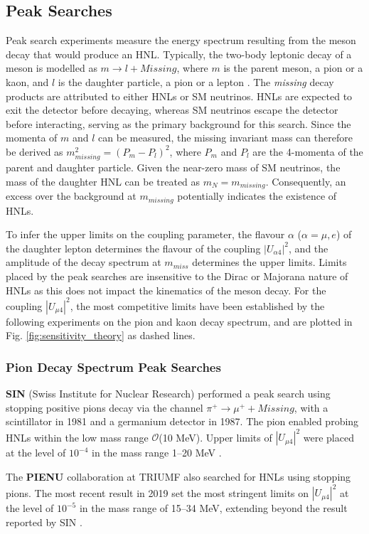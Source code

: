 \subsection{Peak Searches}
\label{sec:peaksearch}

Peak search experiments measure the energy spectrum resulting from the meson decay that would produce an HNL. 
Typically, the two-body leptonic decay of a meson is modelled as $m\rightarrow l + Missing$, where $m$ is the parent meson, a pion or a kaon, and $l$ is the daughter particle, a pion or a lepton \cite{OwenPhD}.
The \textit{missing} decay products are attributed to either HNLs or SM neutrinos.
HNLs are expected to exit the detector before decaying, whereas SM neutrinos escape the detector before interacting, serving as the primary background for this search.
Since the momenta of $m$ and $l$ can be measured, the missing invariant mass can therefore be derived as $m^{2}_{missing} = (P_{m} - P_{l})^{2}$, where $P_{m}$ and $P_{l}$ are the 4-momenta of the parent and daughter particle.
Given the near-zero mass of SM neutrinos, the mass of the daughter HNL can be treated as $m_{N} = m_{missing}$.
Consequently, an excess over the background at $m_{missing}$ potentially indicates the existence of HNLs.

To infer the upper limits on the coupling parameter, the flavour $\alpha$ ($\alpha =\mu,e$) of the daughter lepton determines the flavour of the coupling $|U_{\alpha4}|^2$, and the amplitude of the decay spectrum at $m_{miss}$ determines the upper limits.
Limits placed by the peak searches are insensitive to the Dirac or Majorana nature of HNLs as this does not impact the kinematics of the meson decay.
For the coupling $|U_{\mu4}|^{2}$, the most competitive limits have been established by the following experiments on the pion and kaon decay spectrum, and are plotted in Fig. \ref{fig:sensitivity_theory} as dashed lines.

\subsubsection{Pion Decay Spectrum Peak Searches}

\begin{coloritemize}
\item \textbf{SIN} (Swiss Institute for Nuclear Research) performed a peak search using stopping positive pions decay via the channel $\pi^{+} \rightarrow \mu^{+} + Missing$, with a scintillator in 1981 and a germanium detector in 1987.
The pion enabled probing HNLs within the low mass range $\mathcal{O}$(10 MeV).
Upper limits of $|U_{\mu4}|^{2}$ were placed at the level of $10^{-4}$ in the mass range 1--20 MeV \cite{SIN1, SIN2, SIN3}.

\item The \textbf{PIENU} collaboration at TRIUMF also searched for HNLs using stopping pions.
The most recent result in 2019 set the most stringent limits on $|U_{\mu4}|^{2}$ at the level of $10^{-5}$ in the mass range of 15--34 MeV, extending beyond the result reported by SIN \cite{PIENU}.

\end{coloritemize}

